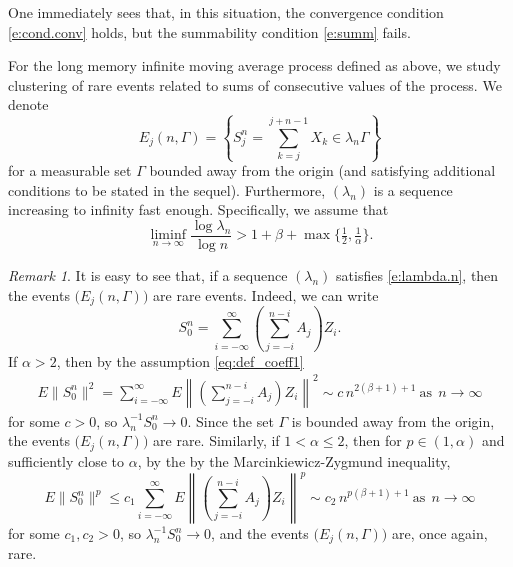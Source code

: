 \documentclass[11pt,reqno]{amsart}
\numberwithin{equation}{section}
\theoremstyle{definition}
\theoremstyle{remark}
\newtheorem{remark}{Remark}[section]
\theoremstyle{definition}
\newcommand{\notesJQ}[1] {
	\iftoggle{answers} {
		\smallskip
		{\color{blue}{#1}}
		\smallskip
	}{}
}
\begin{document}
One immediately sees that, in this situation, the convergence condition
\eqref{e:cond.conv} holds,  but the summability condition
\eqref{e:summ} fails.


For the long memory infinite moving average process defined as
above, we study clustering of rare events related to  sums of
consecutive values of the process. We denote 
\begin{equation}\label{def:rareevent}
    E_j(n, \Gamma) = \left\{ S_j^n = \sum_{k=j}^{j+n-1} X_k \in \lambda_n \Gamma \right\}
  \end{equation}
for a measurable set $\Gamma$ bounded away from the origin (and
satisfying additional conditions to be stated in the
sequel). Furthermore, $(\lambda_n)$ is a sequence increasing to
infinity fast enough.  Specifically, we assume that
\begin{equation} \label{e:lambda.n}
    \liminf_{n\to\infty} \frac{\log \lambda_n}{\log n} >1 + \beta + \max\Big\{\tfrac{1}{2}, \tfrac{1}{\alpha}\Big\}.
  \end{equation}
   \begin{remark} \label{rk:lambda.seq}
 It is easy to see that, if a sequence $(\lambda_n)$ satisfies
 \eqref{e:lambda.n}, then the events $\bigl(E_j(n,\Gamma)\bigr)$ are
 rare events.  Indeed,  we can write
 \begin{equation} \label{e:sum.repr}
   S_0^n = \sum_{i=-\infty}^\infty
   \left(\sum_{j=-i}^{n-i}A_j\right)Z_i. 
 \end{equation}
If $\alpha>2$, then by the assumption \eqref{eq:def_coeff1} 
 \begin{align*}
E\|S_0^n\|^2 = \sum_{i=-\infty}^\infty E\left\|
   \left(\sum_{j=-i}^{n-i}A_j\right)Z_i\right\|^2 \sim c\,
   n^{2(\beta+1)+1} \ \text{as} \ \ n\to\infty
 \end{align*}
 for some $c>0$, so $\lambda_n^{-1}S_0^n\to 0$. Since the  set
 $\Gamma$ is bounded away from the origin, the events
 $\bigl(E_j(n,\Gamma)\bigr)$ are  rare. Similarly, if $1<\alpha\leq
 2$, then for  $p\in (1,\alpha)$ and sufficiently close to $\alpha$,
 by the by the Marcinkiewicz-Zygmund
inequality,
 $$
 E\|S_0^n\|^p \leq c_1 \sum_{i=-\infty}^\infty E\left\|
   \left(\sum_{j=-i}^{n-i}A_j\right)Z_i\right\|^p \sim c_2\,
   n^{p(\beta+1)+1} \ \text{as} \ \ n\to\infty
$$
for some $c_1,c_2>0$, so $\lambda_n^{-1}S_0^n\to 0$, and the events
 $\bigl(E_j(n,\Gamma)\bigr)$ are, once again, rare. 
\end{remark}
\end{document}
